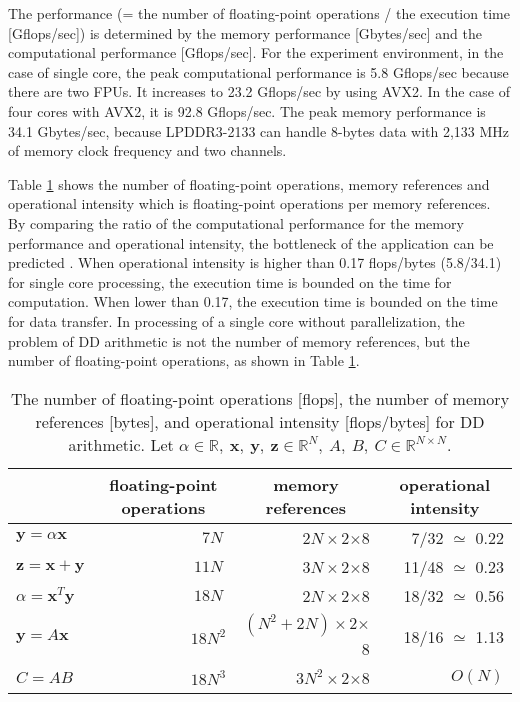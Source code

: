 \documentclass{IOS-Book-Article}
\begin{document}
The performance (= the number of floating-point operations / the execution time [Gflops/sec]) is determined by the memory performance [Gbytes/sec] and the computational performance [Gflops/sec].
For the experiment environment, in the case of single core, the peak computational performance is 5.8 Gflops/sec because there are two FPUs. It increases to 23.2 Gflops/sec by using AVX2. In the case of four cores with AVX2, it is 92.8 Gflops/sec.
The peak memory performance is 34.1 Gbytes/sec, because LPDDR3-2133 can handle 8-bytes data with 2,133 MHz of memory clock frequency and two channels. 

Table \ref{opeData} shows the number of floating-point operations, memory references and operational intensity \cite{roof} which is floating-point operations per memory references. By comparing the ratio of the computational performance for the memory performance and operational intensity, the bottleneck of the application can be predicted \cite{roof}. When operational intensity is higher than 0.17 flops/bytes (5.8/34.1) for single core processing, the execution time is bounded on the time for computation. When lower than 0.17, the execution time is bounded on the time for data transfer. 
In processing of a single core without parallelization, the problem of DD arithmetic is not the number of memory references, but the number of floating-point operations, as shown in Table \ref{opeData}.

\begin{table}[htbp]
\centering
\footnotesize
\caption{The number of floating-point operations [flops], the number of memory references [bytes], and operational intensity [flops/bytes] for DD arithmetic. Let $ \alpha \in \mathbb{R},\ \bm{x},\ \bm{y},\ \bm{z}\in \mathbb{R}^{N},\ A,\ B,\ C \in \mathbb{R}^{N\times N}$.}
\label{opeData}
\begin{tabular}{l||r|r|r}
\hline
    & \multicolumn{1}{c}{floating-point operations}   & \multicolumn{1}{|c|}{memory references}  & \multicolumn{1}{c}{operational intensity}                                    \\ \hline \hline
$\bm{y} = \alpha\bm{x}$ & $7N^{\ } $     & $2N \times 2$$\times$8      &7/32  $ \simeq$	0.22       \\ \hline
$\bm{z} = \bm{x} + \bm{y}$ & $11N^{\ } $     & $3N \times 2$$\times$8   &11/48  $\simeq$	0.23            \\ \hline
$\alpha  = \bm{x}^T\bm{y}$& $18N^{\ }$    &$ 2N  \times 2$$\times$8           &18/32  $\simeq$	0.56          \\ \hline
$\bm{y} = A\bm{x}$ & $18N^2$ &$ (N^2+2N) \times 2$$\times$8 &18/16 $\simeq$	1.13 \\ \hline
$C = AB$  & $18N^3$  & $3N^2 \times 2$$\times$8    &$O(N)$\\ \hline
\end{tabular}
\end{table}
\end{document}
